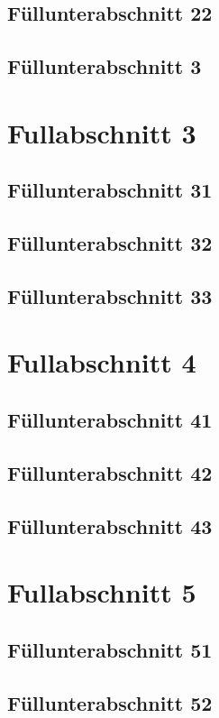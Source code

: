 \documentclass[arbeit=master,oneside,BCOR=12mm]{ArbeitRST}
\begin{document}
\subsection{Füllunterabschnitt 22}
\Blindtext[1][1]
\subsection{Füllunterabschnitt 3}
\Blindtext[1][1]


\section{Fullabschnitt 3}
\subsection{Füllunterabschnitt 31}
\Blindtext[1][1]
\subsection{Füllunterabschnitt 32}
\Blindtext[1][1]
\subsection{Füllunterabschnitt 33}
\Blindtext[1][1]


\section{Fullabschnitt 4}
\subsection{Füllunterabschnitt 41}
\Blindtext[1][1]
\subsection{Füllunterabschnitt 42}
\Blindtext[1][1]
\subsection{Füllunterabschnitt 43}
\Blindtext[1][1]


\section{Fullabschnitt 5}
\subsection{Füllunterabschnitt 51}
\Blindtext[1][1]
\subsection{Füllunterabschnitt 52}
\Blindtext[1][1]
\end{document}
